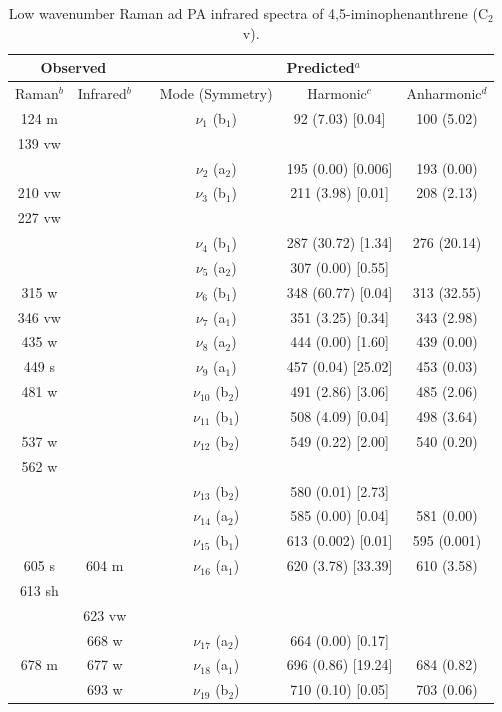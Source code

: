 	
		\begin{table}[H]
			\caption{Low wavenumber Raman ad PA infrared spectra of 4,5-iminophenanthrene (C$_{2}$v).}
			\begin{center}
				\begin{threeparttable}
					\begin{tabular}{c c c c c c}
						\hline
						\multicolumn{ 2}{c}{Observed} & \multicolumn{1}{c}{} & \multicolumn{ 3}{c}{Predicted$^{a}$} \\ \hline
						Raman$^{b}$ & \multicolumn{1}{c}{Infrared$^{b}$} &  & \multicolumn{1}{c}{Mode (Symmetry)} & \multicolumn{1}{c}{Harmonic$^{c}$} & Anharmonic$^{d}$ \\ \hline
124 m &  &  & $\nu_{1}$ (b$_{1}$) & 92 (7.03) [0.04] & 100 (5.02) \\ 
139 vw &  &  &  &  &  \\ 
&  &  & $\nu_{2}$ (a$_{2}$) & 195 (0.00) [0.006] & 193 (0.00) \\ 
210 vw &  &  & $\nu_{3}$ (b$_{1}$) & 211 (3.98) [0.01] & 208 (2.13) \\ 
227 vw &  &  &  &  &  \\ 
&  &  & $\nu_{4}$ (b$_{1}$) & 287 (30.72) [1.34] & 276 (20.14) \\
&  &  & $\nu_{5}$ (a$_{2}$) & 307 (0.00) [0.55] &  \\ 
315 w &  &  & $\nu_{6}$ (b$_{1}$) & 348 (60.77) [0.04] & 313 (32.55) \\
346 vw &  &  & $\nu_{7}$ (a$_{1}$) & 351 (3.25) [0.34] & 343 (2.98) \\
435 w &  &  & $\nu_{8}$ (a$_{2}$) & 444 (0.00) [1.60] & 439 (0.00) \\ 
449 s &  &  & $\nu_{9}$ (a$_{1}$) & 457 (0.04) [25.02] & 453 (0.03) \\ 
481 w &  &  & $\nu_{10}$ (b$_{2}$)& 491 (2.86) [3.06] & 485 (2.06) \\ 
&  &  & $\nu_{11}$ (b$_{1}$) & 508 (4.09) [0.04] & 498 (3.64) \\ 
537 w &  &  & $\nu_{12}$ (b$_{2}$) & 549 (0.22) [2.00] & 540 (0.20) \\ 
562 w &  &  &  &  &  \\ 
&  &  & $\nu_{13}$ (b$_{2}$) & 580 (0.01) [2.73] &  \\ 
&  &  & $\nu_{14}$ (a$_{2}$) & 585 (0.00) [0.04] & 581 (0.00) \\
&  &  & $\nu_{15}$ (b$_{1}$) & 613 (0.002) [0.01] & 595 (0.001) \\ 
605 s & 604 m &  & $\nu_{16}$ (a$_{1}$) & 620 (3.78) [33.39] & 610 (3.58) \\ 
613 sh &  &  &  &  &  \\
& \multicolumn{1}{c}{623 vw} &  &  &  &  \\ 
& \multicolumn{1}{c}{668 w} &  & $\nu_{17}$ (a$_{2}$) & 664 (0.00) [0.17] &  \\
678 m & \multicolumn{1}{c}{677 w} & & $\nu_{18}$ (a$_{1}$) & 696 (0.86) [19.24] & 684 (0.82) \\ 
& \multicolumn{1}{c}{693 w} &  & $\nu_{19}$ (b$_{2}$) & 710 (0.10) [0.05] & 703 (0.06) \\
			\bottomrule
		\end{tabular}
	

\end{threeparttable}
\end{center}
\end{table}
